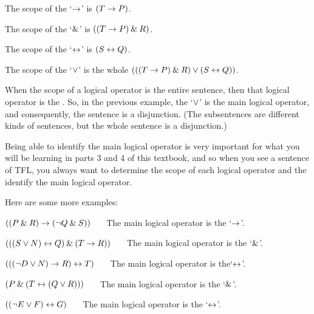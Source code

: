 \begin{ebullet}
	\item[] The scope of the `$\rightarrow$' is $(T \rightarrow P)$. 
	\item[] The scope of the `$\mathbin{\&}$' is $((T \rightarrow P) \mathbin{\&} R)$.
	\item[] The scope of the `$\leftrightarrow$' is $(S \leftrightarrow Q)$.
	\item[] The scope of the `$\vee$' is the whole $(((T \rightarrow P) \mathbin{\&} R) \vee (S \leftrightarrow Q))$.
\end{ebullet}

When the scope of a logical operator is the entire sentence, then that logical operator is the . So, in the previous example, the `$\vee$' is the main logical operator, and consequently, the sentence is a disjunction. (The subsentences are different kinds of sentences, but the whole sentence is a disjunction.)

Being able to identify the main logical operator is very important for what you will be learning in parts 3 and 4 of this textbook, and so when you see a sentence of TFL, you always want to determine the scope of each logical operator and the identify the main logical operator. 

\begin{comment}
Now, let's turn to expressions in TFL. Although identifying the main logical operator in a long expression in TFL can seem confusing at first, because we are using parentheses, you'll find that it's not too difficult. Let's start with this example: $((P \eand Q) \eor R)$. This is a disjunction. One disjunct is $(P \eand Q)$ and the other is $R$. Hence, the main logical operator is the `$\eor$'. 

Let's change the expression to $\enot((P \eand Q) \eor R)$. This is a negation, and so the main logical operator is the `$\enot$'. Notice that the `$\enot$' is outside of the brackets that enclose the entire `$(P \eand Q) \eor R$'. That means that the `$\enot$' applies to the entire sentence. Hence, it is the main logical operator. 
\end{comment}

Here are some more examples:
\begin{earg}
\item[\ex{logic-operator1}] $((P \mathbin{\&} R) \rightarrow ({\neg} Q \mathbin{\&} S))$ ~~~The main logical operator is the `$\rightarrow$'. 
\item[\ex{logic-operator2}] $(((S \vee N) \leftrightarrow Q) \mathbin{\&} (T \rightarrow R))$ ~~~The main logical operator is the `$\mathbin{\&}$'.
\item[\ex{logic-operator3}] $((({\neg} D \vee N) \rightarrow R) \leftrightarrow T)$ ~~~The main logical operator is the`$\leftrightarrow$'.
\item[\ex{logic-operator4}] $(P \mathbin{\&} (T \leftrightarrow (Q \vee R)))$ ~~~The main logical operator is the `$\mathbin{\&}$'. 
\item[\ex{logic-operator5}] $(({\neg} E \vee F) \leftrightarrow G)$ ~~~The main logical operator is the `$\leftrightarrow$'.
\end{earg}



